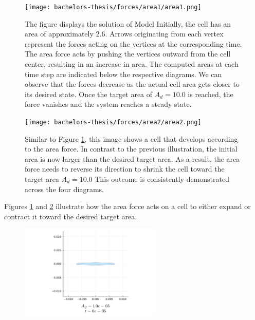 \begin{figure}
	\begin{center}
		\texttt{[image: bachelors-thesis/forces/area1/area1.png]}
		\caption{The figure displays the solution of Model  
		Initially, the cell has an area of approximately $2.6$. 
		Arrows originating from each vertex represent the forces acting on the vertices at the corresponding time.
		The area force acts by pushing the vertices outward from the cell center, resulting in an increase in area.
		The computed areas at each time step are indicated below the respective diagrams.
		We can observe that the forces decrease as the actual cell area gets closer to its desired state. 
		Once the target area of $A_d = 10.0$ is reached, the force vanishes and the system reaches a steady state.
		}
		\label{fig:areaForce}
	\end{center}
\end{figure}

\begin{figure}
	\begin{center}
		\texttt{[image: bachelors-thesis/forces/area2/area2.png]}
		\caption{Similar to Figure \ref{fig:areaForce}, this image shows a cell that develops according to the area force. 
		In contrast to the previous illustration, the initial area is now larger than the desired target area.
		As a result, the area force needs to reverse its direction to shrink the cell toward the target area $A_d = 10.0$
		This outcome is consistently demonstrated across the four diagrams. }
		\label{fig:areaForce2}
	\end{center}
\end{figure}

Figures \ref{fig:areaForce} and \ref{fig:areaForce2} illustrate how the area force acts on a cell to either expand or contract it toward the desired target area.
\begin{figure}[h!]
  \centering
  \href{run:./figures/gifs/showForces/show-areaForce.gif}{
    \includegraphics[width=0.6\textwidth]{figures/gifs/showForces/t0-area.png}}
\end{figure}
    
